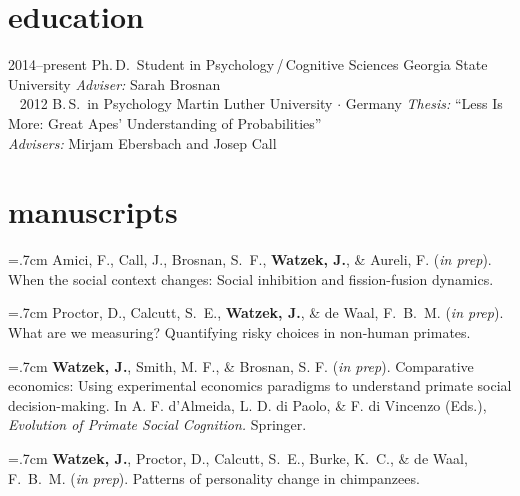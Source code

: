\documentclass[]{friggeri-cv}
\begin{document}
\section{education}

\begin{entrylist}
  \entry
    {2014--present}
    {Ph.\,D.~Student in Psychology\,/\,Cognitive Sciences}
    {Georgia State University}
    {\emph{Adviser:} Sarah Brosnan\\~}
  \entry
    {2012}
    {B.\,S.~in Psychology}
    {Martin Luther University $\cdot$ Germany}
    {\emph{Thesis:} ``Less Is More: Great Apes' Understanding of Probabilities''\\
    \emph{Advisers:} Mirjam Ebersbach and Josep Call}
\end{entrylist}

%

\section{manuscripts}

\hangindent=.7cm Amici, F., Call, J., Brosnan, S.~F., \textbf{Watzek, J.}, \& Aureli, F. (\emph{in prep}). When the social context changes: Social inhibition and fission-fusion dynamics.

\hangindent=.7cm Proctor, D., Calcutt, S.~E., \textbf{Watzek, J.}, \& de Waal, F.~B.~M. (\emph{in prep}). What are we measuring? Quantifying risky choices in non-human primates.

\hangindent=.7cm \textbf{Watzek, J.}, Smith, M. F., \& Brosnan, S. F. (\emph{in prep}). Comparative economics: Using experimental economics paradigms to understand primate social decision-making. In A. F. d'Almeida, L. D. di Paolo, \& F. di Vincenzo (Eds.), \emph{Evolution of Primate Social Cognition.} Springer.

\hangindent=.7cm \textbf{Watzek, J.}, Proctor, D., Calcutt, S.~E., Burke, K.~C., \& de Waal, F.~B.~M. (\emph{in prep}). Patterns of personality change in chimpanzees.
\end{document}
